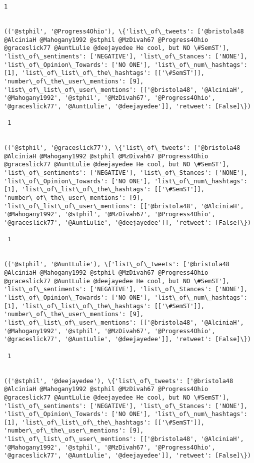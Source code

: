 \documentclass[11pt]{article}
\begin{document}
\begin{Verbatim}[commandchars=\\\{\}]
 1
 

(('@stphil', '@Progress4Ohio'), \{'list\_of\_tweets': ['@bristola48 @AlciniaH @Mahogany1992 @stphil @MzDivah67 @Progress4Ohio @graceslick77 @AuntLulie @deejayedee He cool, but NO \#SemST'], 'list\_of\_sentiments': ['NEGATIVE'], 'list\_of\_Stances': ['NONE'], 'list\_of\_Opinion\_Towards': ['NO ONE'], 'list\_of\_num\_hashtags': [1], 'list\_of\_list\_of\_the\_hashtags': [['\#SemST']], 'number\_of\_the\_user\_mentions': [9], 'list\_of\_list\_of\_user\_mentions': [['@bristola48', '@AlciniaH', '@Mahogany1992', '@stphil', '@MzDivah67', '@Progress4Ohio', '@graceslick77', '@AuntLulie', '@deejayedee']], 'retweet': [False]\})

 1
 

(('@stphil', '@graceslick77'), \{'list\_of\_tweets': ['@bristola48 @AlciniaH @Mahogany1992 @stphil @MzDivah67 @Progress4Ohio @graceslick77 @AuntLulie @deejayedee He cool, but NO \#SemST'], 'list\_of\_sentiments': ['NEGATIVE'], 'list\_of\_Stances': ['NONE'], 'list\_of\_Opinion\_Towards': ['NO ONE'], 'list\_of\_num\_hashtags': [1], 'list\_of\_list\_of\_the\_hashtags': [['\#SemST']], 'number\_of\_the\_user\_mentions': [9], 'list\_of\_list\_of\_user\_mentions': [['@bristola48', '@AlciniaH', '@Mahogany1992', '@stphil', '@MzDivah67', '@Progress4Ohio', '@graceslick77', '@AuntLulie', '@deejayedee']], 'retweet': [False]\})

 1
 

(('@stphil', '@AuntLulie'), \{'list\_of\_tweets': ['@bristola48 @AlciniaH @Mahogany1992 @stphil @MzDivah67 @Progress4Ohio @graceslick77 @AuntLulie @deejayedee He cool, but NO \#SemST'], 'list\_of\_sentiments': ['NEGATIVE'], 'list\_of\_Stances': ['NONE'], 'list\_of\_Opinion\_Towards': ['NO ONE'], 'list\_of\_num\_hashtags': [1], 'list\_of\_list\_of\_the\_hashtags': [['\#SemST']], 'number\_of\_the\_user\_mentions': [9], 'list\_of\_list\_of\_user\_mentions': [['@bristola48', '@AlciniaH', '@Mahogany1992', '@stphil', '@MzDivah67', '@Progress4Ohio', '@graceslick77', '@AuntLulie', '@deejayedee']], 'retweet': [False]\})

 1
 

(('@stphil', '@deejayedee'), \{'list\_of\_tweets': ['@bristola48 @AlciniaH @Mahogany1992 @stphil @MzDivah67 @Progress4Ohio @graceslick77 @AuntLulie @deejayedee He cool, but NO \#SemST'], 'list\_of\_sentiments': ['NEGATIVE'], 'list\_of\_Stances': ['NONE'], 'list\_of\_Opinion\_Towards': ['NO ONE'], 'list\_of\_num\_hashtags': [1], 'list\_of\_list\_of\_the\_hashtags': [['\#SemST']], 'number\_of\_the\_user\_mentions': [9], 'list\_of\_list\_of\_user\_mentions': [['@bristola48', '@AlciniaH', '@Mahogany1992', '@stphil', '@MzDivah67', '@Progress4Ohio', '@graceslick77', '@AuntLulie', '@deejayedee']], 'retweet': [False]\})


\end{Verbatim}
\end{document}

